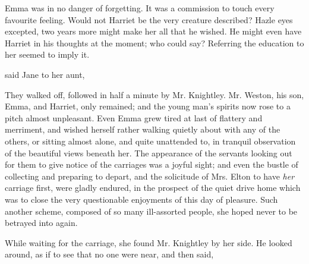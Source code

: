 



Emma was in no danger of forgetting. It was a commission to touch every favourite feeling. Would not Harriet be the very creature described? Hazle eyes excepted, two years more might make her all that he wished. He might even have Harriet in his thoughts at the moment; who could say? Referring the education to her seemed to imply it.

 said Jane to her aunt, 


They walked off, followed in half a minute by Mr. Knightley. Mr. Weston, his son, Emma, and Harriet, only remained; and the young man's spirits now rose to a pitch almost unpleasant. Even Emma grew tired at last of flattery and merriment, and wished herself rather walking quietly about with any of the others, or sitting almost alone, and quite unattended to, in tranquil observation of the beautiful views beneath her. The appearance of the servants looking out for them to give notice of the carriages was a joyful sight; and even the bustle of collecting and preparing to depart, and the solicitude of Mrs. Elton to have {\em her} carriage first, were gladly endured, in the prospect of the quiet drive home which was to close the very questionable enjoyments of this day of pleasure. Such another scheme, composed of so many ill-assorted people, she hoped never to be betrayed into again.

While waiting for the carriage, she found Mr. Knightley by her side. He looked around, as if to see that no one were near, and then said,


